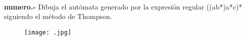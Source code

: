 \paragraph{}
\textbf{{numero}.-} Dibuja el autómata generado por la expresión regular ((a\textbar b*)a*c)* siguiendo el método de Thompson.
\begin{figure}[ht!]
\centering
\texttt{[image: .jpg]}
\end{figure}